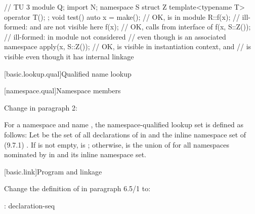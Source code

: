 \begin{std.txt}
\begin{codeblock}
// TU 3
module Q;
import N;
namespace S {
  struct Z { template<typename T> operator T(); };
}
void test() {
  auto x = make();    // OK,  is  in module 
  R::f(x);            // ill-formed:  and  are not visible here
  f(x);               // OK, calls  from interface of 
  f(x, S::Z());       // ill-formed:  in module  not considered
                      // even though  is an associated namespace
  apply(x, S::Z());   // OK,  is visible in instantiation context, and
                      //  is visible even though it has internal linkage
}
\end{codeblock}
\added{\exitexample}
\end{std.txt}

\setcounter{subsection}{2}
[basic.lookup.qual]{Qualified name lookup}

\setcounter{subsubsection}{1}
[namespace.qual]{Namespace members}

Change in paragraph 2:

\begin{std.txt}
\pnum[2]
For a namespace 
and name ,
the namespace-qualified lookup set  is defined as follows:
Let  be the set of all declarations of  in 
and the inline namespace set of  (9.7.1)
.
If  is not empty,  is ;
otherwise,  is the union of 
for all namespaces  nominated by 
in  and its inline namespace set.
\end{std.txt}

\setcounter{section}{4}
[basic.link]{Program and linkage}%

Change the definition of  in paragraph 6.5/1
to:

\begin{bnf}
:\br
    declaration-seq\opt\br
\end{bnf}

